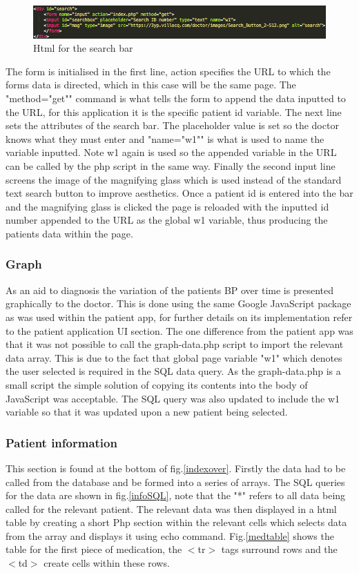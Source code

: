 \documentclass[11pt]{article}
\begin{document}
\begin{figure}
\centering
\includegraphics[scale=0.4]{searchbarhtml.png}
\caption{Html for the search bar \label{searchbarhtml}} 
\end{figure}
The form is initialised in the first line, action specifies the URL to which the forms data is directed, which in this case will be the same page. The "method="get"" command is what tells the form to append the data inputted to the URL, for this application it is the specific patient id variable. The next line sets the attributes of the search bar. The placeholder value is set so the doctor knows what they must enter and "name="w1"" is what is used to name the variable inputted. Note w1 again is used so the appended variable in the URL can be called by the php script in the same way. Finally the second input line screens the image of the magnifying glass which is used instead of the standard text search button to improve aesthetics. Once a patient id is entered into the bar and the magnifying glass is clicked the page is reloaded with the inputted id number appended to the URL as the global w1 variable, thus producing the patients data within the page. 

\subsubsection{Graph}
As an aid to diagnosis the variation of the patients BP over time is presented graphically to the doctor. This is done using the same Google JavaScript package as was used within the patient app, for further details on its implementation refer to the patient application UI section. The one difference from the patient app was that it was not possible to call the graph-data.php script to import the relevant data array. This is due to the fact that global page variable "w1" which denotes the user selected is required in the SQL data query. As the graph-data.php is a small script the simple solution of copying its contents into the body of JavaScript was acceptable. The SQL query was also updated to include the w1 variable so that it was updated upon a new patient being selected. 

\subsubsection{Patient information}
This section is found at the bottom of fig.\ref{indexover}. Firstly the data had to be called from the database and be formed into a series of arrays. The SQL queries for the data are shown in fig.\ref{infoSQL}, note that the "*" refers to all data being called for the relevant patient. The relevant data was then displayed in a html table by creating a short Php section within the relevant cells which selects data from the array and displays it using echo command. Fig.\ref{medtable} shows the table for the first piece of medication, the $<$tr$>$ tags surround rows and the $<$td$>$ create cells within these rows. 
\end{document}
